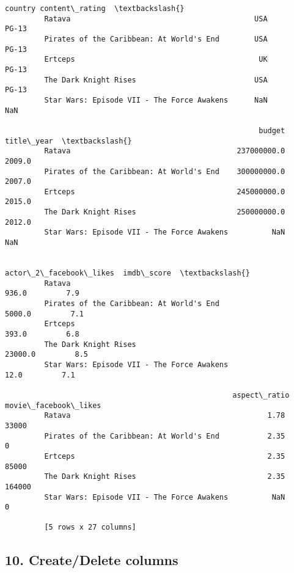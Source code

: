 \documentclass[11pt]{article}
\begin{document}
\begin{Verbatim}[commandchars=\\\{\}]
                                                     country content\_rating  \textbackslash{}
         Ratava                                          USA          PG-13   
         Pirates of the Caribbean: At World's End        USA          PG-13   
         Ertceps                                          UK          PG-13   
         The Dark Knight Rises                           USA          PG-13   
         Star Wars: Episode VII - The Force Awakens      NaN            NaN   
         
                                                          budget title\_year  \textbackslash{}
         Ratava                                      237000000.0     2009.0   
         Pirates of the Caribbean: At World's End    300000000.0     2007.0   
         Ertceps                                     245000000.0     2015.0   
         The Dark Knight Rises                       250000000.0     2012.0   
         Star Wars: Episode VII - The Force Awakens          NaN        NaN   
         
                                                    actor\_2\_facebook\_likes  imdb\_score  \textbackslash{}
         Ratava                                                      936.0         7.9   
         Pirates of the Caribbean: At World's End                   5000.0         7.1   
         Ertceps                                                     393.0         6.8   
         The Dark Knight Rises                                     23000.0         8.5   
         Star Wars: Episode VII - The Force Awakens                   12.0         7.1   
         
                                                    aspect\_ratio movie\_facebook\_likes  
         Ratava                                             1.78                33000  
         Pirates of the Caribbean: At World's End           2.35                    0  
         Ertceps                                            2.35                85000  
         The Dark Knight Rises                              2.35               164000  
         Star Wars: Episode VII - The Force Awakens          NaN                    0  
         
         [5 rows x 27 columns]
\end{Verbatim}
            
    \hypertarget{createdelete-columns}{%
\subsection{10. Create/Delete columns}\label{createdelete-columns}}
\end{document}
